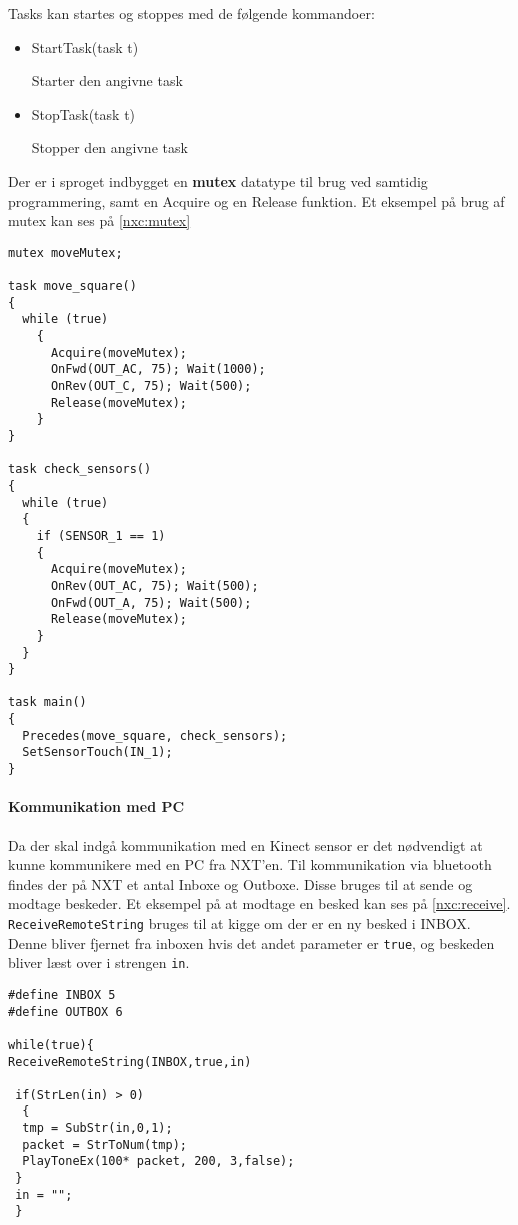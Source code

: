 Tasks kan startes og stoppes med de følgende kommandoer:

\begin{itemize}
\item StartTask(task t)

Starter den angivne task
\item StopTask(task t)

Stopper den angivne task
\end{itemize}

Der er i sproget indbygget en \textbf{mutex} datatype til brug ved samtidig programmering, samt en Acquire og en Release funktion.
Et eksempel på brug af mutex kan ses på \cref{nxc:mutex}

\begin{lstlisting}[style=c,label=nxc:mutex, caption={Eksempel på brug af mutex}]
mutex moveMutex;

task move_square()
{
  while (true)
    {
      Acquire(moveMutex);
      OnFwd(OUT_AC, 75); Wait(1000);
      OnRev(OUT_C, 75); Wait(500);
      Release(moveMutex);
    }
}

task check_sensors()
{
  while (true)
  {
    if (SENSOR_1 == 1)
    {
      Acquire(moveMutex);
      OnRev(OUT_AC, 75); Wait(500);
      OnFwd(OUT_A, 75); Wait(500);
      Release(moveMutex);
    }
  }
}

task main()
{
  Precedes(move_square, check_sensors);
  SetSensorTouch(IN_1);
}
\end{lstlisting}

\paragraph{Kommunikation med PC}
Da der skal indgå kommunikation med en Kinect sensor er det nødvendigt at kunne kommunikere med en PC fra NXT'en.
Til kommunikation via bluetooth findes der på NXT et antal Inboxe og Outboxe. 
Disse bruges til at sende og modtage beskeder.
Et eksempel på at modtage en besked kan ses på \cref{nxc:receive}.
\lstinline[style=c]|ReceiveRemoteString| bruges til at kigge om der er en ny besked i INBOX.
Denne bliver fjernet fra inboxen hvis det andet parameter er \lstinline[style=c]|true|, og beskeden bliver læst over i strengen \lstinline[style=c]|in|.

\begin{lstlisting}[style=c,label=nxc:receive,caption={Et eksempel på at modtage beskeder over bluetooth}]
#define INBOX 5
#define OUTBOX 6

while(true){
ReceiveRemoteString(INBOX,true,in)

 if(StrLen(in) > 0)
  {
  tmp = SubStr(in,0,1);
  packet = StrToNum(tmp);
  PlayToneEx(100* packet, 200, 3,false);
 }
 in = "";
 }
\end{lstlisting}

